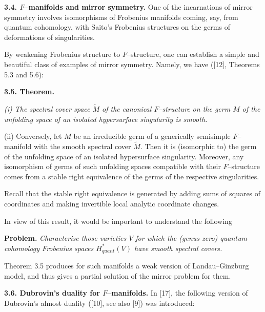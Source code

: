 {\medskip

{\bf 3.4. $F$--manifolds and mirror symmetry.}  One of the incarnations
of mirror symmetry involves isomorphisms of Frobenius manifolds
coming, say, from quantum cohomology, with Saito's Frobenius structures
on the germs of deformations of singularities.

\smallskip

By weakening Frobenius structure to $F$--structure, one can establish
a simple and beautiful class of examples of mirror symmetry.
Namely, we have  ([12], Theorems 5.3 and 5.6):


\medskip

{\bf 3.5. Theorem.} {\it  (i) The spectral cover space $\widetilde{M}$
of the canonical $F$--structure on the germ $M$ of the 
unfolding space
of an isolated hypersurface singularity is smooth.

\medskip

(ii) Conversely, let $M$ be an irreducible germ of a generically
semisimple $F$--manifold with 
the smooth spectral cover $\widetilde{M}.$
Then it is (isomorphic to) the germ of the unfolding space
of an 
isolated hypersurface singularity. Moreover, any isomorphism
of germs of such unfolding 
spaces compatible with their
$F$--structure comes from a  stable right equivalence of the
germs 
of the respective singularities.}

\smallskip

 Recall that the stable right equivalence is generated by adding sums
of squares of coordinates 
and making invertible local analytic
coordinate changes.

\smallskip

In view of this result, it would be important to understand
the following

\smallskip

{\bf Problem.} {\it Characterise those varieties $V$ for which the (genus zero)
 quantum cohomology Frobenius 
 spaces $H^*_{quant}(V)$ have
smooth spectral covers.}

\smallskip

Theorem 3.5 produces for such manifolds a weak version
of Landau--Ginzburg model, and 
thus gives a partial
solution of the mirror problem for them.

\medskip

{\bf 3.6. Dubrovin's duality for $F$--manifolds.} In [17], the following
version of  Dubrovin's almost duality ([10], see also [9]) was introduced:

\smallskip

}
